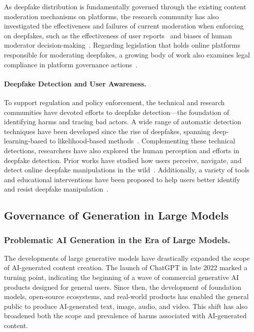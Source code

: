 As deepfake distribution is fundamentally governed through the existing content moderation mechanisms on platforms, the research community has also investigated the effectiveness and failures of current moderation when enforcing on deepfakes, such as the effectiveness of user reports~\cite{qiwei2024deepfakes} and biases of human moderator decision-making~\cite{mink2024s}. Regarding legislation that holds online platforms responsible for moderating deepfakes, a growing body of work also examines legal compliance in platform governance actions~\cite{cuevas2026deepfake}.

\paragraph{Deepfake Detection and User Awareness.} To support regulation and policy enforcement, the technical and research communities have devoted efforts to deepfake detection---the foundation of identifying harms and tracing bad actors. A wide range of automatic detection techniques have been developed since the rise of deepfakes, spanning deep-learning-based to likelihood-based methods~\cite{rana2022deepfake, westerlund2019emergence, al2023impact}. Complementing these technical detections, researchers have also explored the human perception and efforts in deepfake detection. Prior works have studied how users perceive, navigate, and detect online deepfake manipulations in the wild~\cite{tahir2021seeing, umbach2024non, mink2022deepphish}. Additionally, a variety of tools and educational interventions have been proposed to help users better identify and resist deepfake manipulation~\cite{hwang2021effects, zhai2025hear}.


\subsection{Governance of Generation in Large Models}
\label{subsec:genaisafety}
\subsubsection{Problematic AI Generation in the Era of Large Models.} 
The developments of large generative models have drastically expanded the scope of AI-generated content creation. The launch of ChatGPT in late 2022 marked a turning point, indicating the beginning of a wave of commercial generative AI products designed for general users. Since then, the development of foundation models, open-source ecosystems, and real-world products has enabled the general public to produce AI-generated text, image, audio, and video. This shift has also broadened both the scope and prevalence of harms associated with AI-generated content.


